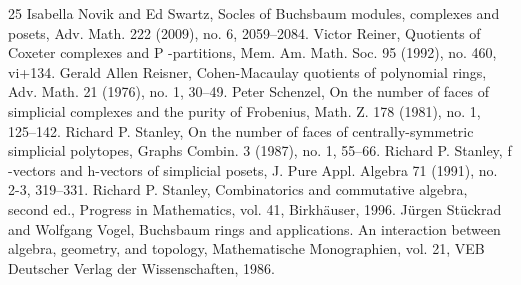 \begin{thebibliography}{25}
 Isabella Novik and Ed Swartz, Socles of Buchsbaum modules, complexes and posets, Adv. Math. 222 (2009), no. 6, 2059–2084.
 Victor Reiner, Quotients of Coxeter complexes and P -partitions, Mem. Am. Math. Soc. 95 (1992), no. 460, vi+134.
 Gerald Allen Reisner, Cohen-Macaulay quotients of polynomial rings, Adv. Math. 21 (1976), no. 1, 30–49.
 Peter Schenzel, On the number of faces of simplicial complexes and the purity of Frobenius, Math. Z. 178 (1981), no. 1, 125–142.
 Richard P. Stanley, On the number of faces of centrally-symmetric simplicial polytopes, Graphs Combin. 3 (1987), no. 1, 55–66.
 Richard P. Stanley, f -vectors and h-vectors of simplicial posets, J. Pure Appl. Algebra 71 (1991), no. 2-3, 319–331.
 Richard P. Stanley, Combinatorics and commutative algebra, second ed., Progress in Mathematics, vol. 41, Birkhäuser, 1996.
 Jürgen Stückrad and Wolfgang Vogel, Buchsbaum rings and applications. An interaction between algebra, geometry, and topology, Mathematische Monographien, vol. 21, VEB Deutscher Verlag der Wissenschaften, 1986.
\end{thebibliography}
